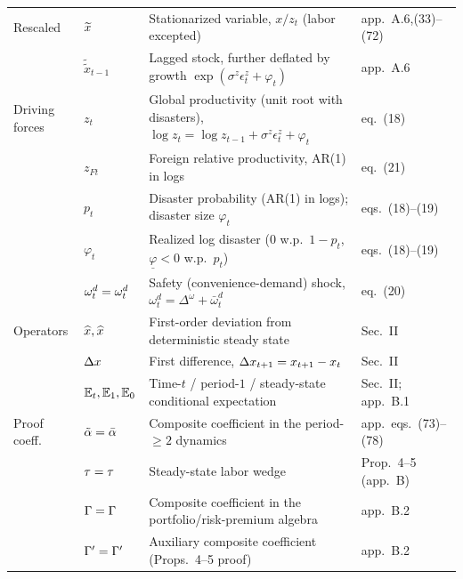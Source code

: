 \begin{longtable}{@{}p{2.55cm} p{2.0cm} p{7.2cm} p{2.4cm}@{}}
Rescaled         & $\widetilde{x}$                 & Stationarized variable, $x/z_t$ (labor excepted)                               & app.\ A.6,(33)--(72) \\
                 & $\widetilde{\widetilde{x}}_{t-1}$ & Lagged stock, further deflated by growth $\exp(\sigma^z\epsilon^z_t+\varphi_t)$ & app.\ A.6 \\
Driving forces   & $z_t$                    & Global productivity (unit root with disasters), $\log z_t=\log z_{t-1}+\sigma^z\epsilon^z_t+\varphi_t$ & eq.\ (18) \\
                 & $z_{Ft}$                 & Foreign relative productivity, AR(1) in logs                                   & eq.\ (21) \\
                 & $p_t$                    & Disaster probability (AR(1) in logs); disaster size $\varphi_t$                 & eqs.\ (18)--(19) \\
                 & $\varphi_t$              & Realized log disaster ($0$ w.p.\ $1-p_t$, $\underline\varphi<0$ w.p.\ $p_t$)    & eqs.\ (18)--(19) \\
                 & $\omega^{d}_t=\omega^d_t$      & Safety (convenience-demand) shock, $\omega^d_t=\Delta^\omega+\bar\omega^d_t$    & eq.\ (20) \\
Operators        & $\widehat{x},\widehat{x}$    & First-order deviation from deterministic steady state                           & Sec.\ II \\
                 & $\Delta x$                   & First difference, $\Delta x_{t+1}=x_{t+1}-x_t$                                       & Sec.\ II \\
                 & $\mathbb{E}_t,\mathbb{E}_1,\mathbb{E}_0$       & Time-$t$ / period-$1$ / steady-state conditional expectation                    & Sec.\ II; app.\ B.1 \\
Proof coeff.\    & $\tilde{\alpha}=\bar\alpha$       & Composite coefficient in the period-$\ge 2$ dynamics                            & app.\ eqs.\ (73)--(78) \\
                 & $\tau=\tau$           & Steady-state labor wedge                                                        & Prop.\ 4--5 (app.\ B) \\
                 & $\Gamma=\Gamma$            & Composite coefficient in the portfolio/risk-premium algebra                     & app.\ B.2 \\
                 & $\Gamma'=\Gamma'$          & Auxiliary composite coefficient (Props.\ 4--5 proof)                            & app.\ B.2 \\

\end{longtable}

